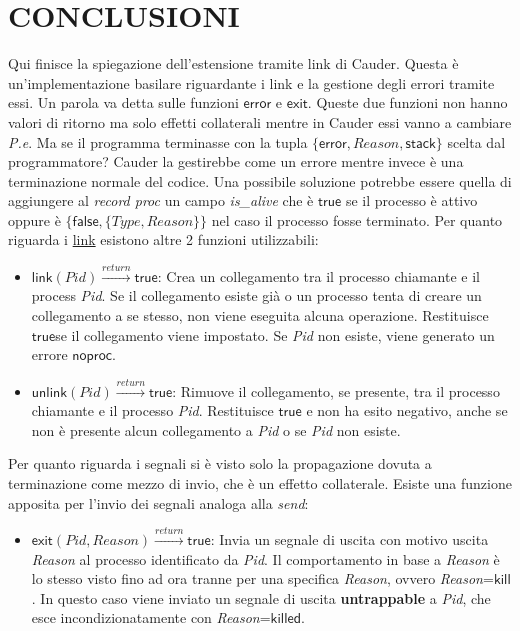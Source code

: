 \documentclass[Tesi.tex]{subfiles}
\begin{document}
\section{CONCLUSIONI}
Qui finisce la spiegazione dell'estensione tramite link di Cauder.
Questa è un'implementazione basilare riguardante i link e la gestione degli errori tramite essi.
Un parola va detta sulle funzioni $\mathsf{error}$ e $\mathsf{exit}$.
Queste due funzioni non hanno valori di ritorno ma solo effetti collaterali mentre in Cauder essi vanno a cambiare \textit{P.e}.
Ma se il programma terminasse con la tupla $\displaystyle \{\mathsf{error},Reason,\mathsf{stack}\}$ scelta dal programmatore?
Cauder la gestirebbe come un errore mentre invece è una terminazione normale del codice.
Una possibile soluzione potrebbe essere quella di aggiungere al \textit{record proc} un campo \textit{is\_alive} che è $\mathsf{true}$ se il processo è attivo oppure è $\displaystyle \{\mathsf{false},\{Type,Reason\}\}$ nel caso il processo fosse terminato. 
Per quanto riguarda i \underline{link} esistono altre 2 funzioni utilizzabili:
\begin{itemize}
	\item $\displaystyle \mathsf{link}(Pid)\xrightarrow{return}\mathsf{true}$: Crea un collegamento tra il processo chiamante e il process \textit{Pid}. Se il collegamento esiste già o un processo tenta di creare un collegamento a se stesso, non viene eseguita alcuna operazione. Restituisce $\mathsf{true}$se il collegamento viene impostato.
	Se \textit{Pid} non esiste, viene generato un errore $\mathsf{noproc}$.
	\item $\displaystyle \mathsf{unlink}(Pid)\xrightarrow{return}\mathsf{true}$: Rimuove il collegamento, se presente, tra il processo chiamante e il processo \textit{Pid}. Restituisce $\mathsf{true}$ e non ha esito negativo, anche se non è presente alcun collegamento a \textit{Pid} o se \textit{Pid} non esiste.
\end{itemize}
Per quanto riguarda i segnali si è visto solo la propagazione dovuta a terminazione come mezzo di invio, che è un effetto collaterale.
Esiste una funzione apposita per l'invio dei segnali analoga alla \textit{send}:
\begin{itemize}
	\item $\displaystyle \mathsf{exit}(Pid,Reason)\xrightarrow{return}\mathsf{true}$: Invia un segnale di uscita con motivo uscita \textit{Reason} al processo identificato da \textit{Pid}.
	Il comportamento in base a \textit{Reason} è lo stesso visto fino ad ora tranne per una specifica \textit{Reason}, ovvero \textit{Reason}=$\mathsf{kill}$.
	In questo caso  viene inviato un segnale di uscita \textbf{untrappable} a \textit{Pid}, che esce incondizionatamente con \textit{Reason}=$\mathsf{killed}$.
\end{itemize}
\end{document}
